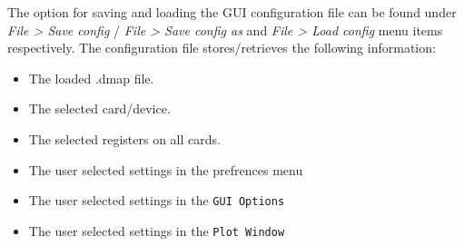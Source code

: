 The option for saving and loading the GUI configuration file can be found under \textit{File > Save config} / \textit{File > Save config as} and \textit{File > Load config }menu items respectively. The configuration file stores/retrieves the following information:

\begin{itemize}
\item The loaded .dmap file.
\item The selected card/device.
\item The selected registers on all cards.
\item The user selected settings in the prefrences menu
\item The user selected settings in the \texttt{GUI Options}
\item The user selected settings in the \texttt{Plot Window}
\end{itemize}



%
%


%
%
%
%
%




